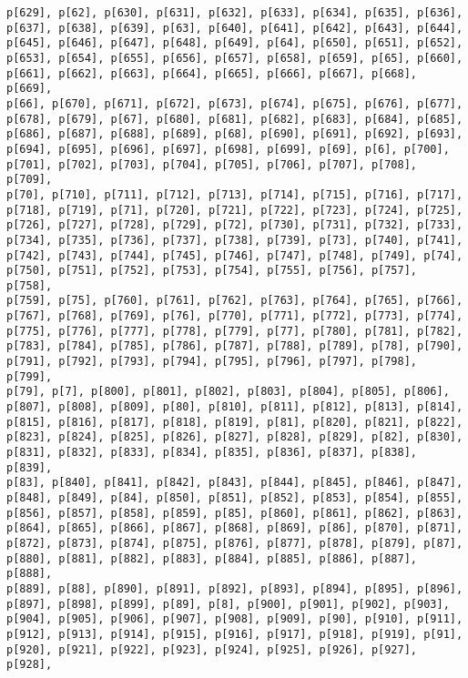\documentclass[
  letterpaper,
  DIV=11,
  numbers=noendperiod]{scrartcl}
\begin{document}
\begin{verbatim}
p[629], p[62], p[630], p[631], p[632], p[633], p[634], p[635], p[636],
p[637], p[638], p[639], p[63], p[640], p[641], p[642], p[643], p[644],
p[645], p[646], p[647], p[648], p[649], p[64], p[650], p[651], p[652],
p[653], p[654], p[655], p[656], p[657], p[658], p[659], p[65], p[660],
p[661], p[662], p[663], p[664], p[665], p[666], p[667], p[668], p[669],
p[66], p[670], p[671], p[672], p[673], p[674], p[675], p[676], p[677],
p[678], p[679], p[67], p[680], p[681], p[682], p[683], p[684], p[685],
p[686], p[687], p[688], p[689], p[68], p[690], p[691], p[692], p[693],
p[694], p[695], p[696], p[697], p[698], p[699], p[69], p[6], p[700],
p[701], p[702], p[703], p[704], p[705], p[706], p[707], p[708], p[709],
p[70], p[710], p[711], p[712], p[713], p[714], p[715], p[716], p[717],
p[718], p[719], p[71], p[720], p[721], p[722], p[723], p[724], p[725],
p[726], p[727], p[728], p[729], p[72], p[730], p[731], p[732], p[733],
p[734], p[735], p[736], p[737], p[738], p[739], p[73], p[740], p[741],
p[742], p[743], p[744], p[745], p[746], p[747], p[748], p[749], p[74],
p[750], p[751], p[752], p[753], p[754], p[755], p[756], p[757], p[758],
p[759], p[75], p[760], p[761], p[762], p[763], p[764], p[765], p[766],
p[767], p[768], p[769], p[76], p[770], p[771], p[772], p[773], p[774],
p[775], p[776], p[777], p[778], p[779], p[77], p[780], p[781], p[782],
p[783], p[784], p[785], p[786], p[787], p[788], p[789], p[78], p[790],
p[791], p[792], p[793], p[794], p[795], p[796], p[797], p[798], p[799],
p[79], p[7], p[800], p[801], p[802], p[803], p[804], p[805], p[806],
p[807], p[808], p[809], p[80], p[810], p[811], p[812], p[813], p[814],
p[815], p[816], p[817], p[818], p[819], p[81], p[820], p[821], p[822],
p[823], p[824], p[825], p[826], p[827], p[828], p[829], p[82], p[830],
p[831], p[832], p[833], p[834], p[835], p[836], p[837], p[838], p[839],
p[83], p[840], p[841], p[842], p[843], p[844], p[845], p[846], p[847],
p[848], p[849], p[84], p[850], p[851], p[852], p[853], p[854], p[855],
p[856], p[857], p[858], p[859], p[85], p[860], p[861], p[862], p[863],
p[864], p[865], p[866], p[867], p[868], p[869], p[86], p[870], p[871],
p[872], p[873], p[874], p[875], p[876], p[877], p[878], p[879], p[87],
p[880], p[881], p[882], p[883], p[884], p[885], p[886], p[887], p[888],
p[889], p[88], p[890], p[891], p[892], p[893], p[894], p[895], p[896],
p[897], p[898], p[899], p[89], p[8], p[900], p[901], p[902], p[903],
p[904], p[905], p[906], p[907], p[908], p[909], p[90], p[910], p[911],
p[912], p[913], p[914], p[915], p[916], p[917], p[918], p[919], p[91],
p[920], p[921], p[922], p[923], p[924], p[925], p[926], p[927], p[928],

\end{verbatim}
\end{document}
